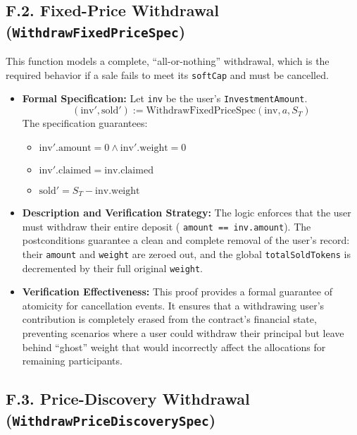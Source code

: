 \documentclass[
  english,
  onecolumn]{article}
\providecommand{\tightlist}{%
  \setlength{\itemsep}{0pt}\setlength{\parskip}{0pt}}
\begin{document}
\subsection{\texorpdfstring{F.2. Fixed-Price Withdrawal
(\texttt{WithdrawFixedPriceSpec})}{F.2. Fixed-Price Withdrawal (WithdrawFixedPriceSpec)}}\label{f.2.-fixed-price-withdrawal-withdrawfixedpricespec}

This function models a complete, ``all-or-nothing'' withdrawal, which is
the required behavior if a sale fails to meet its \texttt{softCap} and
must be cancelled.

\begin{itemize}
\tightlist
\item
  \textbf{Formal Specification:} Let \texttt{inv} be the user's
  \texttt{InvestmentAmount}. \[
  (\text{inv}', \text{sold}') := \text{WithdrawFixedPriceSpec}(\text{inv}, a, S_T)
  \] The specification guarantees:

  \begin{itemize}
  \tightlist
  \item
    \(\text{inv}'.\text{amount} = 0 \land \text{inv}'.\text{weight} = 0\)
  \item
    \(\text{inv}'.\text{claimed} = \text{inv}.\text{claimed}\)
  \item
    \(\text{sold}' = S_T - \text{inv}.\text{weight}\)
  \end{itemize}
\item
  \textbf{Description and Verification Strategy:} The logic enforces
  that the user must withdraw their entire deposit (
  \texttt{amount\ ==\ inv.amount}). The postconditions guarantee a clean
  and complete removal of the user's record: their \texttt{amount} and
  \texttt{weight} are zeroed out, and the global
  \texttt{totalSoldTokens} is decremented by their full original
  \texttt{weight}.
\item
  \textbf{Verification Effectiveness:} This proof provides a formal
  guarantee of atomicity for cancellation events. It ensures that a
  withdrawing user's contribution is completely erased from the
  contract's financial state, preventing scenarios where a user could
  withdraw their principal but leave behind ``ghost'' weight that would
  incorrectly affect the allocations for remaining participants.
\end{itemize}

\subsection{\texorpdfstring{F.3. Price-Discovery Withdrawal
(\texttt{WithdrawPriceDiscoverySpec})}{F.3. Price-Discovery Withdrawal (WithdrawPriceDiscoverySpec)}}\label{f.3.-price-discovery-withdrawal-withdrawpricediscoveryspec}
\end{document}
